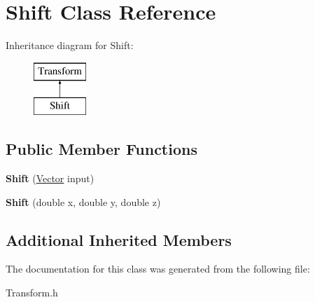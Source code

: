 \hypertarget{class_shift}{}\section{Shift Class Reference}
\label{class_shift}
Inheritance diagram for Shift\+:\begin{figure}[H]
\begin{center}
\leavevmode
\includegraphics[height=2.000000cm]{class_shift}
\end{center}
\end{figure}
\subsection*{Public Member Functions}
\begin{DoxyCompactItemize}
\item 
\hypertarget{class_shift_a578c0679c998e3a34b9e3ae529e78ab4}{}\label{class_shift_a578c0679c998e3a34b9e3ae529e78ab4} 
{\bfseries Shift} (\hyperlink{class_vector}{Vector} input)
\item 
\hypertarget{class_shift_aabc77a031682d7ae89d5e113edd28770}{}\label{class_shift_aabc77a031682d7ae89d5e113edd28770} 
{\bfseries Shift} (double x, double y, double z)
\end{DoxyCompactItemize}
\subsection*{Additional Inherited Members}


The documentation for this class was generated from the following file\+:\begin{DoxyCompactItemize}
\item 
Transform.\+h\end{DoxyCompactItemize}
